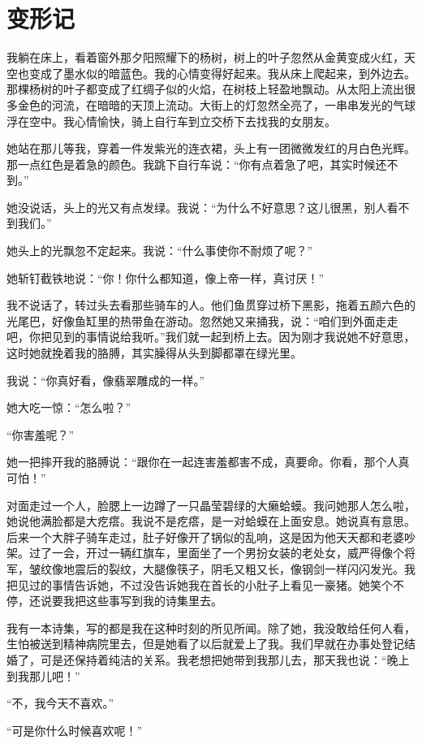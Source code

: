 \chapter{变形记}

我躺在床上，看着窗外那夕阳照耀下的杨树，树上的叶子忽然从金黄变成火红，天空也变成了墨水似的暗蓝色。我的心情变得好起来。我从床上爬起来，到外边去。那棵杨树的叶子都变成了红绸子似的火焰，在树枝上轻盈地飘动。从太阳上流出很多金色的河流，在暗暗的天顶上流动。大街上的灯忽然全亮了，一串串发光的气球浮在空中。我心情愉快，骑上自行车到立交桥下去找我的女朋友。 

她站在那儿等我，穿着一件发紫光的连衣裙，头上有一团微微发红的月白色光辉。那一点红色是着急的颜色。我跳下自行车说：“你有点着急了吧，其实时候还不到。” 

她没说话，头上的光又有点发绿。我说：“为什么不好意思？这儿很黑，别人看不到我们。” 

她头上的光飘忽不定起来。我说：“什么事使你不耐烦了呢？” 

她斩钉截铁地说：“你！你什么都知道，像上帝一样，真讨厌！” 

我不说话了，转过头去看那些骑车的人。他们鱼贯穿过桥下黑影，拖着五颜六色的光尾巴，好像鱼缸里的热带鱼在游动。忽然她又来捅我，说：“咱们到外面走走吧，你把见到的事情说给我听。”我们就一起到桥上去。因为刚才我说她不好意思，这时她就挽着我的胳膊，其实臊得从头到脚都罩在绿光里。 

我说：“你真好看，像翡翠雕成的一样。” 

她大吃一惊：“怎么啦？” 

“你害羞呢？” 

她一把摔开我的胳膊说：“跟你在一起连害羞都害不成，真要命。你看，那个人真可怕！” 

对面走过一个人，脸腮上一边蹲了一只晶莹碧绿的大癞蛤蟆。我问她那人怎么啦，她说他满脸都是大疙瘩。我说不是疙瘩，是一对蛤蟆在上面安息。她说真有意思。后来一个大胖子骑车走过，肚子好像开了锅似的乱响，这是因为他天天都和老婆吵架。过了一会，开过一辆红旗车，里面坐了一个男扮女装的老处女，威严得像个将军，皱纹像地震后的裂纹，大腿像筷子，阴毛又粗又长，像钢剑一样闪闪发光。我把见过的事情告诉她，不过没告诉她我在首长的小肚子上看见一豪猪。她笑个不停，还说要我把这些事写到我的诗集里去。 

我有一本诗集，写的都是我在这种时刻的所见所闻。除了她，我没敢给任何人看，生怕被送到精神病院里去，但是她看了以后就爱上了我。我们早就在办事处登记结婚了，可是还保持着纯洁的关系。我老想把她带到我那儿去，那天我也说：“晚上到我那儿吧！” 

“不，我今天不喜欢。” 

“可是你什么时候喜欢呢！” 

